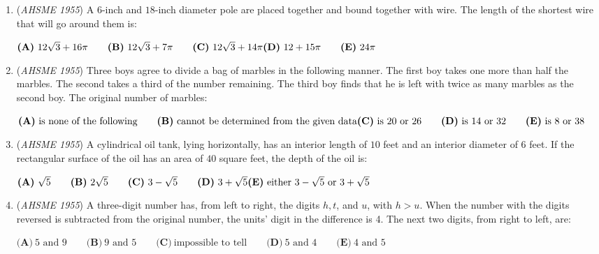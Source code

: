 \begin{enumerate}
 $\textbf{(A)}\ \text{6 hr.}\qquad\textbf{(B)}\ \text{6 hr.   } 43\frac{7}{11} \text{min.}\qquad\textbf{(C)}\ \text{5 hr.   } 16\frac{4}{11} \text{min.}\qquad\textbf{(D)}\ \text{6 hr. 30 min.}\qquad\textbf{(E)}\ \text{none of these}$


	\item (\textit{AHSME 1955}) A $6$-inch and $18$-inch diameter pole are placed together and bound together with wire. 
The length of the shortest wire that will go around them is: 


 $\textbf{(A)}\ 12\sqrt{3}+16\pi\qquad\textbf{(B)}\ 12\sqrt{3}+7\pi\qquad\textbf{(C)}\ 12\sqrt{3}+14\pi\\ \textbf{(D)}\ 12+15\pi\qquad\textbf{(E)}\ 24\pi$


	\item (\textit{AHSME 1955}) Three boys agree to divide a bag of marbles in the following manner. The first boy takes one more than half the marbles. 
The second takes a third of the number remaining. The third boy finds that he is left with twice as many marbles as the second boy. 
The original number of marbles: 


 $\textbf{(A)}\ \text{is none of the following}\qquad\textbf{(B)}\ \text{cannot be determined from the given data}\\ \textbf{(C)}\ \text{is 20 or 26}\qquad\textbf{(D)}\ \text{is 14 or 32}\qquad\textbf{(E)}\ \text{is 8 or 38}$


	\item (\textit{AHSME 1955}) A cylindrical oil tank, lying horizontally, has an interior length of $10$ feet and an interior diameter of $6$ feet. 
If the rectangular surface of the oil has an area of $40$ square feet, the depth of the oil is: 


 $\textbf{(A)}\ \sqrt{5}\qquad\textbf{(B)}\ 2\sqrt{5}\qquad\textbf{(C)}\ 3-\sqrt{5}\qquad\textbf{(D)}\ 3+\sqrt{5}\\ \textbf{(E)}\ \text{either }3-\sqrt{5}\text{ or }3+\sqrt{5}$


	\item (\textit{AHSME 1955}) A three-digit number has, from left to right, the digits $h, t$, and $u$, with $h>u$. 
When the number with the digits reversed is subtracted from the original number, the units' digit in the difference is 4. 
The next two digits, from right to left, are: 


 $\textbf{(A)}\ \text{5 and 9}\qquad\textbf{(B)}\ \text{9 and 5}\qquad\textbf{(C)}\ \text{impossible to tell}\qquad\textbf{(D)}\ \text{5 and 4}\qquad\textbf{(E)}\ \text{4 and 5}$



\end{enumerate}
